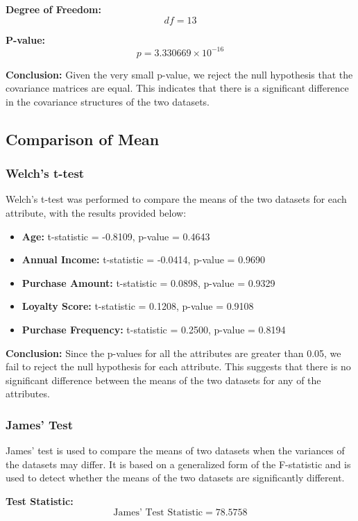 \documentclass[11pt]{article}
\begin{document}
\textbf{Degree of Freedom:}
\[
df = 13
\]

\textbf{P-value:}
\[
p = 3.330669 \times 10^{-16}
\]

\textbf{Conclusion:}
Given the very small p-value, we reject the null hypothesis that the covariance matrices are equal. This indicates that there is a significant difference in the covariance structures of the two datasets.


\subsection{Comparison of Mean}

\subsubsection{Welch's t-test}

Welch's t-test was performed to compare the means of the two datasets for each attribute, with the results provided below:

\begin{itemize}
    \item \textbf{Age:} t-statistic = -0.8109, p-value = 0.4643
    \item \textbf{Annual Income:} t-statistic = -0.0414, p-value = 0.9690
    \item \textbf{Purchase Amount:} t-statistic = 0.0898, p-value = 0.9329
    \item \textbf{Loyalty Score:} t-statistic = 0.1208, p-value = 0.9108
    \item \textbf{Purchase Frequency:} t-statistic = 0.2500, p-value = 0.8194
\end{itemize}

\textbf{Conclusion:}
Since the p-values for all the attributes are greater than 0.05, we fail to reject the null hypothesis for each attribute. This suggests that there is no significant difference between the means of the two datasets for any of the attributes.


\subsubsection{James' Test}
James' test is used to compare the means of two datasets when the variances of the datasets may differ. It is based on a generalized form of the F-statistic and is used to detect whether the means of the two datasets are significantly different.

\textbf{Test Statistic:}
\[
\text{James' Test Statistic} = 78.5758
\]
\end{document}
